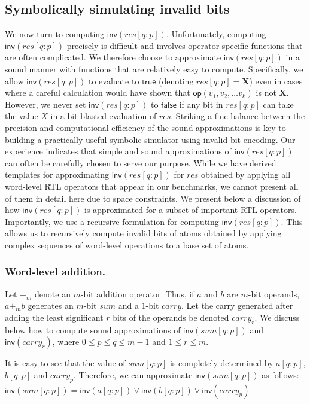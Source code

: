 \documentclass{llncs}
\newcommand{\inv}{\ensuremath{\mathsf{inv}}}
\newcommand{\op}{\ensuremath{\mathsf{op}}}
\newcommand{\plm}{\ensuremath{+_m}}
\newcommand{\true}{\ensuremath{\mathsf{true}}}
\newcommand{\false}{\ensuremath{\mathsf{false}}}
\begin{document}
\subsection{Symbolically simulating invalid bits}\label{subsec:sim-inv}
We now turn to computing ${\inv}(res[q:p])$.  Unfortunately, computing
${\inv}(res[q:p])$ precisely is difficult and involves
operator-specific functions that are often complicated.  We therefore
choose to approximate ${\inv}(res[q:p])$ in a sound manner with
functions that are relatively easy to compute.  Specifically, we allow
${\inv}(res[q:p])$ to evaluate to $\true$ (denoting $res[q:p] =
\mathbf{X}$) even in cases where a careful calculation would have
shown that ${\op}(v_1, v_2, \ldots v_k)$ is not $\mathbf{X}$.
However, we never set ${\inv}(res[q:p])$ to {\false} if any bit in
$res[q:p]$ can take the value $X$ in a bit-blasted evaluation of
$res$.  
Striking a fine balance between the precision and computational
efficiency of the sound approximations is key to building a
practically useful symbolic simulator using invalid-bit encoding.  Our
experience indicates that simple and sound approximations of
${\inv}(res[q:p])$ can often be carefully chosen to serve our purpose.
While we have derived templates for approximating ${\inv}(res[q:p])$
for $res$ obtained by applying all word-level RTL operators that
appear in our benchmarks, we cannot present all of them in detail here
due to space constraints.  We present below a discussion of how
${\inv}(res[q:p])$ is approximated for a subset of important RTL
operators.  Importantly, we use a recursive formulation for computing
${\inv}(res[q:p])$.  This allows us to recursively compute
invalid bits of atoms obtained by applying complex sequences of
word-level operations to a base set of atoms.  

\subsubsection{Word-level addition.} Let $\plm$ denote an
$m$-bit addition operator.  Thus, if $a$ and $b$ are $m$-bit operands,
$a \plm b$ generates an $m$-bit $sum$ and a $1$-bit $carry$.  Let the
carry generated after adding the least significant $r$ bits of the
operands be denoted $carry_r$.  We discuss below how to compute
sound approximations of ${\inv}(sum[q:p])$ and
${\inv}(carry_r)$, where $0 \le p \le q \le m-1$ and $1 \le r \le m$.

It is easy to see that the value of $sum[q:p]$ is completely
determined by $a[q:p]$, $b[q:p]$ and $carry_p$.  Therefore, we can
approximate ${\inv}(sum[q:p])$ as follows:
${\inv}(sum[q:p])\! = \! {\inv}(a[q:p]) \vee {\inv}(b[q:p]) \vee {\inv}(carry_p)$
\end{document}

